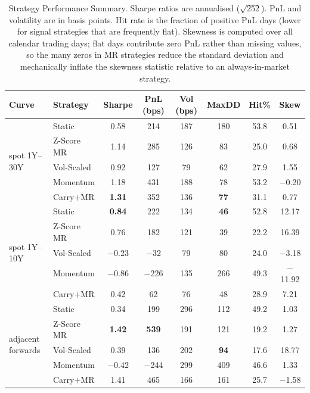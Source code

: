 \documentclass[11pt,a4paper]{article}
\begin{document}
\begin{table}[H]
\centering
\caption{Strategy Performance Summary.  Sharpe ratios are annualised
($\sqrt{252}$).  PnL and volatility are in basis points.  Hit rate is
the fraction of positive PnL days (lower for signal strategies that
are frequently flat).  Skewness is computed over all calendar trading
days; flat days contribute zero PnL rather than missing values, so the
many zeros in MR strategies reduce the standard deviation and
mechanically inflate the skewness statistic relative to an
always-in-market strategy.}
\label{tab:summary}
\small
\begin{tabular}{llcccccc}
\toprule
Curve & Strategy & Sharpe & PnL (bps) & Vol (bps) & MaxDD & Hit\% & Skew \\
\midrule
\multirow{5}{*}{spot 1Y--30Y}
  & Static       & 0.58 & 214  & 187 & 180 & 53.8 & 0.51 \\
  & Z-Score MR   & 1.14 & 285  & 126 & 83  & 25.0 & 0.68 \\
  & Vol-Scaled   & 0.92 & 127  & 79  & 62  & 27.9 & 1.55 \\
  & Momentum     & 1.18 & 431  & 188 & 78  & 53.2 & $-$0.20 \\
  & Carry+MR     & \textbf{1.31} & 352  & 136 & \textbf{77}  & 31.1 & 0.77 \\
\midrule
\multirow{5}{*}{spot 1Y--10Y}
  & Static       & \textbf{0.84} & 222  & 134 & \textbf{46} & 52.8 & 12.17 \\
  & Z-Score MR   & 0.76 & 182  & 121 & 39  & 22.2 & 16.39 \\
  & Vol-Scaled   & $-$0.23 & $-$32  & 79  & 80  & 24.0 & $-$3.18 \\
  & Momentum     & $-$0.86 & $-$226 & 135 & 266 & 49.3 & $-$11.92 \\
  & Carry+MR     & 0.42 & 62   & 76  & 48  & 28.9 & 7.21 \\
\midrule
\multirow{5}{*}{adjacent forwards}
  & Static       & 0.34 & 199  & 296 & 112 & 49.2 & 1.03 \\
  & Z-Score MR   & \textbf{1.42} & \textbf{539} & 191 & 121 & 19.2 & 1.27 \\
  & Vol-Scaled   & 0.39 & 136  & 202 & \textbf{94}  & 17.6 & 18.77 \\
  & Momentum     & $-$0.42 & $-$244 & 299 & 409 & 46.6 & 1.33 \\
  & Carry+MR     & 1.41 & 465  & 166 & 161 & 25.7 & $-$1.58 \\
\bottomrule
\end{tabular}
\end{table}
\end{document}
